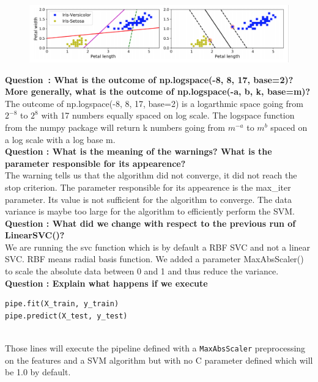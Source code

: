 \begin{figure}[ht]
	\centering 
	\includegraphics[scale = 0.35]{Pics/SVM}
	\label{fig:svmex}
\end{figure}

\textbf{{Question} : What is the outcome of np.logspace(-8, 8, 17, base=2)? More generally, what is the outcome of np.logspace(-a, b, k, base=m)?}\\
The outcome of np.logspace(-8, 8, 17, base=2) is a logarthmic space going from $2^{-8}$ to $2^8$ with 17 numbers equally spaced on log scale.
 The logspace function from the numpy package will return k numbers going from $m^{-a}$ to $m^b$ spaced on a log scale with a log base m. \\

\textbf{Question : What is the meaning of the warnings? What is the parameter responsible for its appearence?}\\
The warning tells us that the algorithm did not converge, it did not reach the stop criterion. The parameter responsible for its appearence is the max\_iter parameter. Its value is not sufficient for the algorithm to converge. The data variance is maybe too large for the algorithm to efficiently perform the SVM. \\

\textbf{Question : What did we change with respect to the previous run of LinearSVC()?} \\
We are running the svc function which is by default a RBF SVC and not a linear SVC. RBF means radial basis function. We added a parameter MaxAbsScaler() to scale the absolute data between 0 and 1 and thus reduce the variance. \\

\textbf{Question : Explain what happens if we execute} 
\begin{verbatim}pipe.fit(X_train, y_train)
pipe.predict(X_test, y_test)\end{verbatim} \\
Those lines will execute the pipeline defined with a \verb|MaxAbsScaler|  preprocessing on the features and a SVM algorithm but with no C parameter defined which will be 1.0 by default.\\

